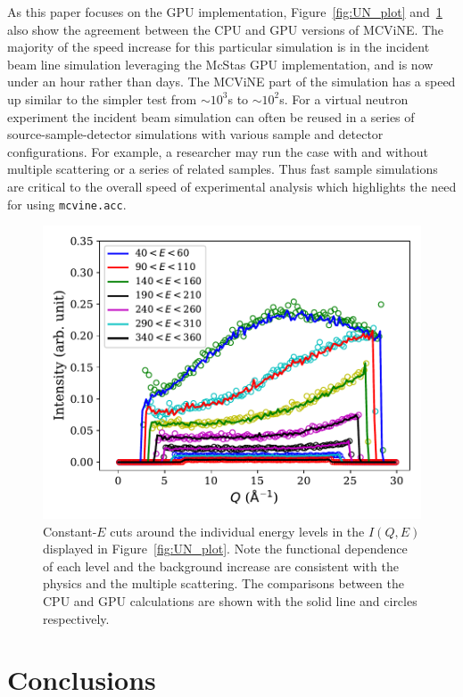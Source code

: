 As this paper focuses on the GPU implementation, Figure~\ref{fig:UN_plot} and~\ref{fig:UN_cuts} also show the agreement between the CPU and GPU versions of MCViNE.
The majority of the speed increase for this particular simulation is in the incident beam line simulation leveraging the McStas GPU implementation, and is now under an hour rather than days.  
The MCViNE part of the simulation has a speed up similar to the simpler test from $\sim 10^3$s to $\sim 10^2$s.
For a virtual neutron experiment the incident beam simulation can often be reused in a series of source-sample-detector simulations with various sample and detector configurations.
For example, a researcher may run the case with and without multiple scattering or a series of related samples. Thus fast sample simulations are critical to the overall speed of experimental analysis which highlights the need for using \texttt{mcvine.acc}.



\begin{figure}[h]
\centering
\includegraphics[width=\columnwidth]{figures/Constant_E_cuts_high_contrast.pdf}
\caption{Constant-$E$ cuts around the individual energy levels 
in the $I(Q, E)$ displayed in
Figure~\ref{fig:UN_plot}. Note the functional dependence of each level and the background increase are consistent with the physics and the multiple scattering. The comparisons between the CPU and GPU calculations are shown with the solid line and circles respectively.
}
\label{fig:UN_cuts}
\end{figure}

\section{Conclusions}

